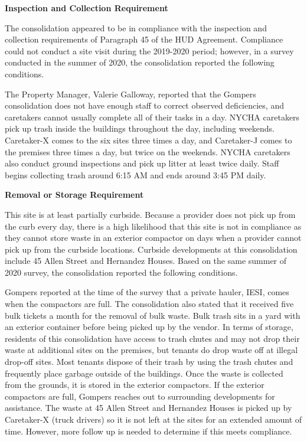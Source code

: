  

\textbf{Inspection and Collection Requirement} 

 

The consolidation appeared to be in compliance with the inspection and collection requirements of Paragraph 45 of the HUD Agreement. Compliance could not conduct a site visit during the 2019-2020 period; however, in a survey conducted in the summer of 2020, the consolidation reported the following conditions. 

The Property Manager, Valerie Galloway, reported that the Gompers consolidation does not have enough staff to correct observed deficiencies, and caretakers cannot usually complete all of their tasks in a day. NYCHA caretakers pick up trash inside the buildings throughout the day, including weekends. Caretaker-X comes to the six sites three times a day, and Caretaker-J comes to the premises three times a day, but twice on the weekends. NYCHA caretakers also conduct ground inspections and pick up litter at least twice daily. Staff begins collecting trash around 6:15 AM and ends around 3:45 PM daily.

\textbf{Removal or Storage Requirement} 

  

This site is at least partially curbside. Because a provider does not pick up from the curb every day, there is a high likelihood that this site is not in compliance as they cannot store waste in an exterior compactor on days when a provider cannot pick up from the curbside locations. Curbside developments at this consolidation include 45 Allen Street and Hernandez Houses. Based on the same summer of  2020 survey, the consolidation reported the following conditions.

 

Gompers reported at the time of the survey that a private hauler, IESI, comes when the compactors are full. The consolidation also stated that it received five bulk tickets a month for the removal of bulk waste. Bulk trash sits in a yard with an exterior container before being picked up by the vendor.  In terms of storage, residents of this consolidation have access to trash chutes and may not drop their waste at additional sites on the premises, but tenants do drop waste off at illegal drop-off sites.  Most tenants dispose of their trash by using the trash chutes and frequently place garbage outside of the buildings. Once the waste is collected from the grounds, it is stored in the exterior compactors. If the exterior compactors are full, Gompers reaches out to surrounding developments for assistance. The waste at 45 Allen Street and Hernandez Houses is picked up by Caretaker-X (truck drivers) so it is not left at the sites for an extended amount of time. However, more follow up is needed to determine if this meets compliance. 

